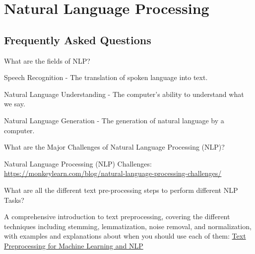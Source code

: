 	\chapter{Natural Language Processing}
	\section{Frequently Asked Questions}

	\resetquestioncounter{}
	\begin{qanda}
		\begin{question}
 What are the fields of NLP?
 		\end{question}
		\begin{answer}
			\begin{bulletedlist}
				\item Speech Recognition - The translation of spoken language into text.
				\item Natural Language Understanding - The computer's ability to understand what we say.
				\item Natural Language Generation - The generation of natural language by a computer.
			\end{bulletedlist}
		\end{answer}
	\end{qanda}

	\begin{qanda}
		\begin{question}
What are the Major Challenges of Natural Language Processing (NLP)?
		\end{question}
		\begin{answer}
Natural Language Processing (NLP) Challenges:\\
{\small \url{https://monkeylearn.com/blog/natural-language-processing-challenges/}}
		\end{answer}
	\end{qanda}

	\begin{qanda}
		\begin{question}
What are all the different text pre-processing steps to perform different NLP Tasks?
		\end{question}
		\begin{answer}
A comprehensive introduction to text preprocessing, covering the different techniques including stemming, lemmatization, noise removal, and normalization, with examples and explanations about when you should use each of them:
\href{https://kavita-ganesan.com/text-preprocessing-tutorial/#.YtCThXbMImL}{Text Preprocessing for Machine Learning and NLP}
		\end{answer}
	\end{qanda}

